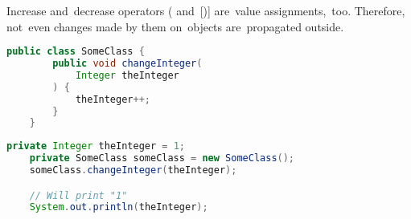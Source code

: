 \note Increase and~decrease operators (\mbitq{++} and~\mbitq{-{}-}[)] are~value assignments,~too.
Therefore, not~even changes made by them on~objects are~propagated outside.

\begin{lstlisting}[language=Java, title={Class with method changing increasing \textit{Integer} instance}]
    public class SomeClass {
        public void changeInteger(
            Integer theInteger
        ) {
            theInteger++;
        }
    }
\end{lstlisting}
\begin{lstlisting}[language=Java, title={Behavior}]
    private Integer theInteger = 1;
    private SomeClass someClass = new SomeClass();
    someClass.changeInteger(theInteger);

    // Will print "1"
    System.out.println(theInteger);
\end{lstlisting}
